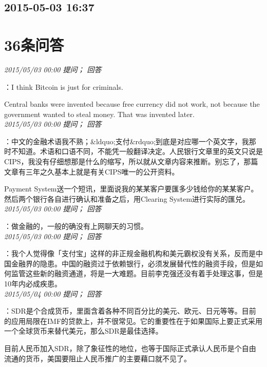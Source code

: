 \documentclass[twocolumn]{ctexart}
\begin{document}
\subsection{2015-05-03 16:37}


\section{36条问答}

\textit{\hfill\noindent\small 2015/05/03 00:00 提问； 回答}

：I think Bitcoin is just for criminals.

Central banks were invented because free currency did not work, not because the government wanted to steal money. That was invented later.\\

\textit{\hfill\noindent\small 2015/05/03 00:00 提问； 回答}

：中文的金融术语我不熟；\&ldquo;支付\&rdquo;到底是对应哪一个英文字，我那时不知道。术语和口语不同，不能凭一般翻译决定。人民银行文章里的英文只说是CIPS，我没有仔细想那是什么的缩写，所以就从文章内容来推断。别忘了，那篇文章有三年之久基本上就是有关CIPS唯一的公开资料。

Payment System送一个短讯，里面说我的某某客户要匯多少钱给你的某某客户。然后两个银行各自进行确认和准备之后，用Clearing System进行实际的匯兑。\\

\textit{\hfill\noindent\small 2015/05/03 00:00 提问； 回答}

：做金融的，一般的确没有上网聊天的习惯。\\

\textit{\hfill\noindent\small 2015/05/03 00:00 提问； 回答}

：我个人觉得像「支付宝」这样的非正规金融机构和美元霸权没有关系，反而是中国金融界的隐患。中国的融资过于依赖银行，必须发展替代性的融资手段，但是如何监管这些新的融资通道，将是一大难题。目前李克强还没有着手处理这事，但是10年内必成疾患。\\

\textit{\hfill\noindent\small 2015/05/04 00:00 提问； 回答}

：SDR是个合成货币，里面含着各种不同百分比的美元、欧元、日元等等。目前的应用局限在IMF的贷款上，并不很常见。它的重要性在于如果国际上要正式采用一个全球货币来替代美元，那么SDR是最佳选择。

目前人民币加入SDR，除了象征性的地位，也等于国际正式承认人民币是个自由流通的货币，美国要阻止人民币推广的主要藉口就不见了。\\
\end{document}
